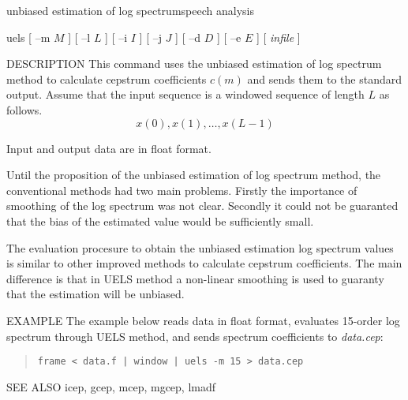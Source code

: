 %
{unbiased estimation of log spectrum}{speech analysis}

\begin{synopsis}
\item [uels] [ --m $M$ ] [ --l $L$ ] [ --i $I$ ] 
	     [ --j $J$ ] [ --d $D$ ] [ --e $E$ ] [ {\em infile} ]
\end{synopsis}

\begin{qsection}{DESCRIPTION}
This command uses the unbiased estimation of log spectrum method
to calculate cepstrum coefficients $c(m)$ and
sends them to the standard output.
Assume that the input sequence is a windowed sequence of length $L$
as follows.
\begin{displaymath}
  x(0),x(1),\ldots,x(L-1)
\end{displaymath}
\par
Input and output data are in float format.
\par
Until the proposition of the unbiased estimation of
log spectrum method, the conventional methods had
two main problems.
Firstly the importance of smoothing of the log spectrum
was not clear.
Secondly it could not be guaranted that
the bias of the estimated value would be sufficiently small.
\par
The evaluation procesure to obtain the unbiased estimation
log spectrum values is similar to other improved methods to
calculate cepstrum coefficients.
The main difference is that in UELS method a non-linear smoothing
is used to guaranty that the estimation will be unbiased.
\end{qsection}

\begin{options}
\end{options}

\begin{qsection}{EXAMPLE}
The example below reads data in float format,
evaluates 15-order log spectrum through UELS method,
and sends spectrum coefficients to {\em data.cep}:
\begin{quote}
 \verb!frame < data.f | window | uels -m 15 > data.cep!
\end{quote} 
\end{qsection}

\begin{qsection}{SEE ALSO}
 icep, gcep, mcep, mgcep, lmadf
\end{qsection}
